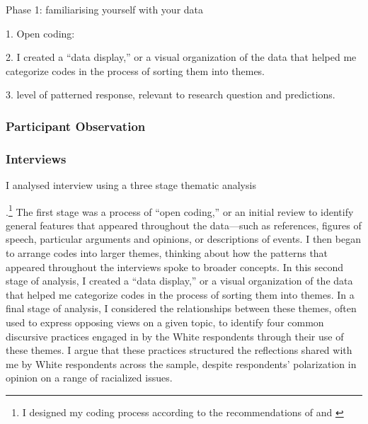 

Phase 1: familiarising yourself with your data

1. Open coding:


2.
I created a ``data display,'' or a visual organization of the data that helped me categorize codes in the process of sorting them into themes.\autocite{Miles1994}

3. level of patterned response, relevant to research question and predictions.



\subsubsection{Participant Observation}

\subsubsection{Interviews}


I analysed interview using a three stage thematic analysis


.\footnote{I designed my coding process according to the recommendations of \cite{Braun2006} and \cite{Weiss1994}} The first stage was a process of ``open coding,'' or an initial review to identify general features that appeared throughout the data---such as references, figures of speech, particular arguments and opinions, or descriptions of events. I then began to arrange codes into larger themes, thinking about how the patterns that appeared throughout the interviews spoke to broader concepts. In this second stage of analysis, I created a ``data display,'' or a visual organization of the data that helped me categorize codes in the process of sorting them into themes.\autocite{Miles1994} In a final stage of analysis, I considered the relationships between these themes, often used to express opposing views on a given topic, to identify four common  discursive practices engaged in by the White respondents through their use of these themes. I argue that these practices structured the reflections shared with me by White respondents across the sample, despite respondents' polarization in opinion on a range of racialized issues.


